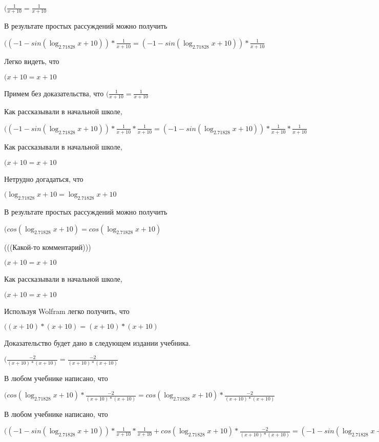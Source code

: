 \documentclass[12pt,a4paper,fleqn]{article}
\theoremstyle{definition}
\begin{document}
$(\frac{ 1 }{ x  +  10 }
 = \frac{ 1 }{ x  +  10 }
$

В результате простых рассуждений можно получить

$(( -1  - sin(\log_{ 2.71828 }{ x  +  10 })) * \frac{ 1 }{ x  +  10 }
 = ( -1  - sin(\log_{ 2.71828 }{ x  +  10 })) * \frac{ 1 }{ x  +  10 }
$

Легко видеть, что

$( x  +  10  =  x  +  10 $

Примем без доказательства, что
$(\frac{ 1 }{ x  +  10 }
 = \frac{ 1 }{ x  +  10 }
$

Как рассказывали в начальной школе,

$(( -1  - sin(\log_{ 2.71828 }{ x  +  10 })) * \frac{ 1 }{ x  +  10 }
 * \frac{ 1 }{ x  +  10 }
 = ( -1  - sin(\log_{ 2.71828 }{ x  +  10 })) * \frac{ 1 }{ x  +  10 }
 * \frac{ 1 }{ x  +  10 }
$

Как рассказывали в начальной школе,

$( x  +  10  =  x  +  10 $

Нетрудно догадаться, что

$(\log_{ 2.71828 }{ x  +  10 } = \log_{ 2.71828 }{ x  +  10 }$

В результате простых рассуждений можно получить

$(cos(\log_{ 2.71828 }{ x  +  10 }) = cos(\log_{ 2.71828 }{ x  +  10 })$

(((Какой-то комментарий)))

$( x  +  10  =  x  +  10 $

Как рассказывали в начальной школе,

$( x  +  10  =  x  +  10 $

Используя Wolfram легко получить, что

$(( x  +  10 ) * ( x  +  10 ) = ( x  +  10 ) * ( x  +  10 )$

Доказательство будет дано в следующем издании учебника.

$(\frac{ -2 }{( x  +  10 ) * ( x  +  10 )}
 = \frac{ -2 }{( x  +  10 ) * ( x  +  10 )}
$

В любом учебнике написано, что

$(cos(\log_{ 2.71828 }{ x  +  10 }) * \frac{ -2 }{( x  +  10 ) * ( x  +  10 )}
 = cos(\log_{ 2.71828 }{ x  +  10 }) * \frac{ -2 }{( x  +  10 ) * ( x  +  10 )}
$

В любом учебнике написано, что

$(( -1  - sin(\log_{ 2.71828 }{ x  +  10 })) * \frac{ 1 }{ x  +  10 }
 * \frac{ 1 }{ x  +  10 }
 + cos(\log_{ 2.71828 }{ x  +  10 }) * \frac{ -2 }{( x  +  10 ) * ( x  +  10 )}
 = ( -1  - sin(\log_{ 2.71828 }{ x  +  10 })) * \frac{ 1 }{ x  +  10 }
 * \frac{ 1 }{ x  +  10 }
 + cos(\log_{ 2.71828 }{ x  +  10 }) * \frac{ -2 }{( x  +  10 ) * ( x  +  10 )}
$
\end{document}
